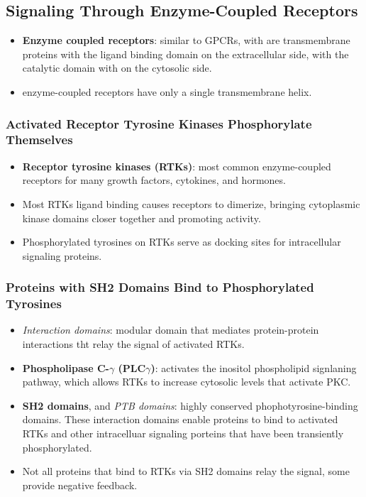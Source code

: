 \documentclass[12pt,a4paper]{article}
\begin{document}
\subsection{Signaling Through Enzyme-Coupled Receptors}
\begin{itemize}
    \item \textbf{Enzyme coupled receptors}: similar to GPCRs, with are transmembrane proteins with the ligand binding domain on the extracellular side, with the catalytic domain with on the cytosolic side.
    \item enzyme-coupled receptors have only a single transmembrane helix.
\end{itemize}

\subsubsection{Activated Receptor Tyrosine Kinases Phosphorylate Themselves}
\begin{itemize}
    \item \textbf{Receptor tyrosine kinases (RTKs)}: most common enzyme-coupled receptors for many growth factors, cytokines, and hormones.
    \item Most RTKs ligand binding causes receptors to dimerize, bringing cytoplasmic kinase domains closer together and promoting activity.
    \item Phosphorylated tyrosines on RTKs serve as docking sites for intracellular signaling proteins.
\end{itemize}

\subsubsection{Proteins with SH2 Domains Bind to Phosphorylated Tyrosines}
\begin{itemize}
    \item \textit{Interaction domains}: modular domain that mediates protein-protein interactions tht relay the signal of activated RTKs.
    \item \textbf{Phospholipase C-$\gamma$ (PLC$\gamma$)}: activates the inositol phospholipid signlaning pathway, which allows RTKs to increase cytosolic  levels that activate PKC.
    \item \textbf{SH2 domains}, and \textit{PTB domains}: highly conserved phophotyrosine-binding domains. These interaction domains enable proteins to bind to activated RTKs and other intracelluar signaling porteins that have been transiently phosphorylated.
    \item Not all proteins that bind to RTKs via SH2 domains relay the signal, some provide negative feedback.
\end{itemize}
\end{document}
